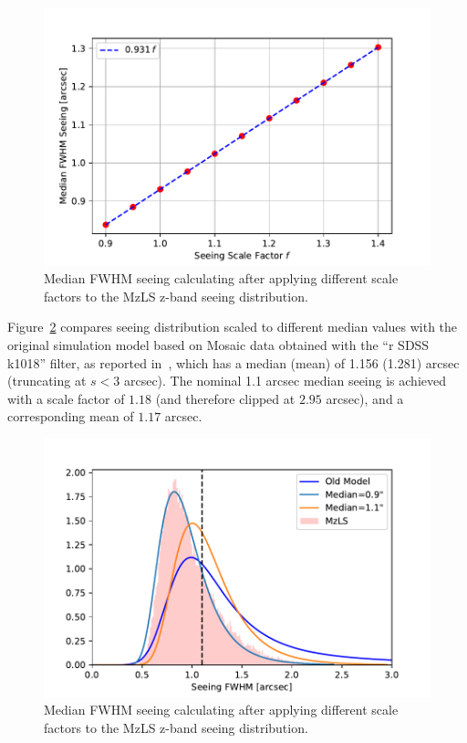 \documentclass[12pt]{article}
\providecommand{\fig}[1]{Figure~\ref{fig:#1}}
\begin{document}
\begin{figure}[htb]
\begin{center}
\includegraphics[width=5in]{seeing-scale}
\caption{Median FWHM seeing calculating after applying different scale factors to the MzLS z-band seeing distribution.}
\label{fig:seeing-scale}
\end{center}
\end{figure}

\fig{seeing-pdf} compares seeing distribution scaled to different median values with the original simulation model based on Mosaic data obtained with the ``r SDSS k1018'' filter, as reported in~\cite{2014PASP..126..296D}, which has a median (mean) of 1.156 (1.281) arcsec (truncating at $s < 3$ arcsec).  The nominal 1.1 arcsec median seeing is achieved with a scale factor of $1.18$ (and therefore clipped at $2.95$ arcsec), and a corresponding mean of $1.17$ arcsec.

\begin{figure}[htb]
\begin{center}
\includegraphics[width=5in]{seeing-pdf}
\caption{Median FWHM seeing calculating after applying different scale factors to the MzLS z-band seeing distribution.}
\label{fig:seeing-pdf}
\end{center}
\end{figure}
\end{document}
